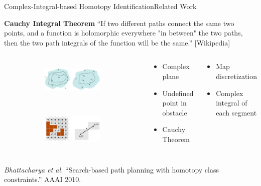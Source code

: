 \begin{frame}{Complex-Integral-based Homotopy Identification}{Related Work}

{\bf Cauchy Integral Theorem} ``If two different paths connect the same two points, and a function is holomorphic everywhere "in between" the two paths, then the two path integrals of the function will be the same.'' [Wikipedia]

\begin{columns}
\begin{figure}
\begin{subfigure}
	\centering
	\includegraphics[width=\linewidth]{figure/cauchy_theorem}
\end{subfigure}
\\
\begin{subfigure}
	\centering
	\includegraphics[width=\linewidth]{figure/cauchy_theorem2}
\end{subfigure}
\end{figure}

\begin{block}{}
\begin{itemize}
\item Complex plane
\item Undefined point in obstacle
\item Cauchy Theorem
\end{itemize}
\end{block}

\begin{block}{}
\begin{itemize}
	\item Map discretization
	\item Complex integral of each segment
\end{itemize}
\end{block}
\end{columns}

\tiny{ {\it Bhattacharya et al.} ``Search-based path planning with homotopy class constraints.'' AAAI 2010. }

\end{frame}

